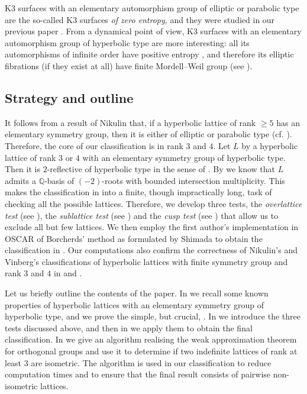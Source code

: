 \documentclass[11pt,letterpaper]{amsart}
\newcommand{\QQ}{\mathbb{Q}}
\theoremstyle{definition}
\theoremstyle{remark}
\begin{document}
K3 surfaces with an elementary automorphism group of elliptic or parabolic type are the so-called K3 surfaces \emph{of zero entropy}, and they were studied in our previous paper \cite{brandhorst.mezzedimi}. From a dynamical point of view, K3 surfaces with an elementary automorphism group of hyperbolic type are more interesting: all its automorphisms of infinite order have positive entropy \cite[Theorem~5.5.8]{ratcliffe}, and therefore its elliptic fibrations (if they exist at all) have finite Mordell--Weil group (see ).

\subsection*{Strategy and outline}
It follows from a result of Nikulin \cite[Theorem 9.1.1]{nikulin.factor.groups} that, if a hyperbolic lattice of rank $\ge 5$ has an elementary symmetry group, then it is either of elliptic or parabolic type (cf. \cite[Theorem~3.9]{brandhorst.mezzedimi}). Therefore, the core of our classification is in rank $3$ and $4$. Let $L$ by a hyperbolic lattice of rank $3$ or $4$ with an elementary symmetry group of hyperbolic type. Then it is $2$-reflective of hyperbolic type in the sense of \cite[Definition 2]{nikulin.interesting}. By \cite[Lemma~1]{nikulin.interesting} we know that $L$ admits a $\QQ$-basis of $(-2)$-roots with bounded intersection multiplicity. This makes the classification in  into a finite, though impractically long, task of checking all the possible lattices. Therefore, we develop three tests, the \emph{overlattice test} (see ), the \emph{sublattice test} (see ) and the \emph{cusp test} (see ) that allow us to exclude all but few lattices. We then employ the first author's implementation in OSCAR \cite{OSCAR} of Borcherds' method \cite{shimada.borcherds} as formulated by Shimada to obtain the classification in . Our computations also confirm the correctness of Nikulin's and Vinberg's classifications of hyperbolic lattices with finite symmetry group and rank $3$ and $4$ in \cite{nikulin.finite.aut.3} and \cite{vinberg.finite.aut.4}. 

Let us briefly outline the contents of the paper. In  we recall some known properties of hyperbolic lattices with an elementary symmetry group of hyperbolic type, and we prove the simple, but crucial, . In  we introduce the three tests discussed above, and then in  we apply them to obtain the final classification. 
In  we give an algorithm realising the weak approximation theorem for orthogonal groups and use it to determine if two indefinite lattices of rank at least $3$ are isometric. The algorithm is used in our classification to reduce computation times and to ensure that the final result consists of pairwise non-isometric lattices. 
\end{document}
